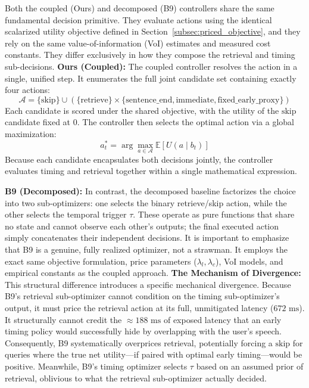 Both the coupled (Ours) and decomposed (B9) controllers share the same fundamental decision primitive. They evaluate actions using the identical scalarized utility objective defined in Section~\ref{subsec:priced_objective}, and they rely on the same value-of-information (VoI) estimates and measured cost constants. They differ exclusively in how they compose the retrieval and timing sub-decisions.
\textbf{Ours (Coupled):} The coupled controller resolves the action in a single, unified step. It enumerates the full joint candidate set containing exactly four actions:
\begin{equation}
\mathcal{A} = \{\text{skip}\} \cup \left( \{\text{retrieve}\} \times \{\text{sentence\_end}, \text{immediate}, \text{fixed\_early\_proxy}\} \right)
\end{equation}
Each candidate is scored under the shared objective, with the utility of the $\text{skip}$ candidate fixed at $0$. The controller then selects the optimal action via a global maximization:
\begin{equation}
a_t^* = \arg\max_{a \in \mathcal{A}} \mathbb{E}[U(a \mid b_t)]
\end{equation}
Because each candidate encapsulates both decisions jointly, the controller evaluates timing and retrieval together within a single mathematical expression.

\textbf{B9 (Decomposed):} In contrast, the decomposed baseline factorizes the choice into two sub-optimizers: one selects the binary retrieve/skip action, while the other selects the temporal trigger $\tau$. These operate as pure functions that share no state and cannot observe each other's outputs; the final executed action simply concatenates their independent decisions. It is important to emphasize that B9 is a genuine, fully realized optimizer, not a strawman. It employs the exact same objective formulation, price parameters ($\lambda_l, \lambda_c$), VoI models, and empirical constants as the coupled approach.
\textbf{The Mechanism of Divergence:} This structural difference introduces a specific mechanical divergence. Because B9's retrieval sub-optimizer cannot condition on the timing sub-optimizer's output, it must price the retrieval action at its full, unmitigated latency ($672\text{ ms}$). It structurally cannot credit the $\approx 188\text{ ms}$ of exposed latency that an early timing policy would successfully hide by overlapping with the user's speech. Consequently, B9 systematically overprices retrieval, potentially forcing a $\text{skip}$ for queries where the true net utility—if paired with optimal early timing—would be positive. Meanwhile, B9's timing optimizer selects $\tau$ based on an assumed prior of retrieval, oblivious to what the retrieval sub-optimizer actually decided.

